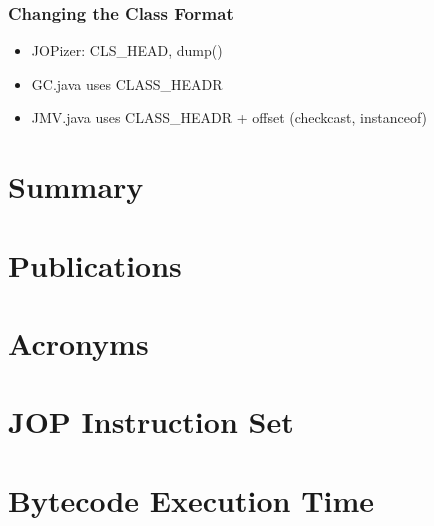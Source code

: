 \subsection{Changing the Class Format}

\begin{itemize}
    \item JOPizer: CLS\_HEAD, dump()
    \item GC.java uses CLASS\_HEADR
    \item JMV.java uses CLASS\_HEADR + offset (checkcast, instanceof)
\end{itemize}

\chapter{Summary}
\label{chap:conclusions}

    







\appendix
 \ihead{\leftmark} %

\chapter{Publications}
    

\chapter{Acronyms}
 \label{appx:acro}



\chapter{JOP Instruction Set} \label{appx:jop:instr}


\chapter{Bytecode Execution Time} \label{appx:bytecode}


